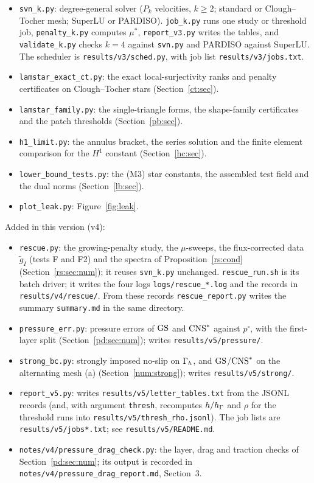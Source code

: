 \begin{itemize}
\item \texttt{svn\_k.py}: degree-general solver ($P_k$ velocities, $k\ge2$; standard or Clough--Tocher mesh; SuperLU or PARDISO). \texttt{job\_k.py} runs one study or threshold job, \texttt{penalty\_k.py} computes $\mu^\ast$, \texttt{report\_v3.py} writes the tables, and \texttt{validate\_k.py} checks $k=4$ against \texttt{svn.py} and PARDISO against SuperLU. The scheduler is \texttt{results/v3/sched.py}, with job list \texttt{results/v3/jobs.txt}.
\item \texttt{lamstar\_exact\_ct.py}: the exact local-surjectivity ranks and penalty certificates on Clough--Tocher stars (Section~\ref{ct:sec}).
\item \texttt{lamstar\_family.py}: the single-triangle forms, the shape-family certificates and the patch thresholds (Section~\ref{pb:sec}).
\item \texttt{h1\_limit.py}: the annulus bracket, the series solution and the finite element comparison for the $H^1$ constant (Section~\ref{hc:sec}).
\item \texttt{lower\_bound\_tests.py}: the (M3) star constants, the assembled test field and the dual norms (Section~\ref{lb:sec}).
\item \texttt{plot\_leak.py}: Figure~\ref{fig:leak}.
\end{itemize}
Added in this version (v4):
\begin{itemize}
\item \texttt{rescue.py}: the growing-penalty study, the $\mu$-sweeps, the flux-corrected data $\tilde g_I$ (tests F and F2) and the spectra of Proposition~\ref{rs:cond} (Section~\ref{rs:sec:num}); it reuses \texttt{svn\_k.py} unchanged. \texttt{rescue\_run.sh} is its batch driver; it writes the four logs \texttt{logs/rescue\_*.log} and the records in \texttt{results/v4/rescue/}. From these records \texttt{rescue\_report.py} writes the summary \texttt{summary.md} in the same directory.
\item \texttt{pressure\_err.py}: pressure errors of $\mathrm{GS}$ and $\mathrm{CNS}^\ast$ against $p^\circ$, with the first-layer split (Section~\ref{pd:sec:num}); writes \texttt{results/v5/pressure/}.
\item \texttt{strong\_bc.py}: strongly imposed no-slip on $\Gamma_h$, and $\mathrm{GS}$/$\mathrm{CNS}^\ast$ on the alternating mesh (a) (Section~\ref{num:strong}); writes \texttt{results/v5/strong/}.
\item \texttt{report\_v5.py}: writes \texttt{results/v5/letter\_tables.txt} from the JSONL records (and, with argument \texttt{thresh}, recomputes $h/h_\Gamma$ and $\rho$ for the threshold runs into \texttt{results/v5/}\allowbreak\texttt{thresh\_rho.jsonl}). The job lists are \texttt{results/v5/jobs*.txt}; see \texttt{results/v5/README.md}.
\item \texttt{notes/v4/pressure\_drag\_check.py}: the layer, drag and traction checks of Section~\ref{pd:sec:num}; its output is recorded in \texttt{notes/v4/pressure\_drag\_report.md}, Section~3.
\end{itemize}

